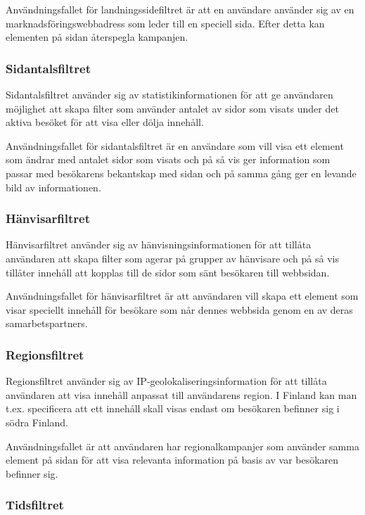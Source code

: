 Användningsfallet för landningssidefiltret är att en användare använder sig av en marknadsföringswebbadress som leder till en speciell sida. Efter detta kan elementen på sidan återspegla kampanjen.

\subsubsection{Sidantalsfiltret}

Sidantalsfiltret använder sig av statistikinformationen för att ge användaren möjlighet att skapa filter som använder antalet av sidor som visats under det aktiva besöket för att visa eller dölja innehåll.

Användningsfallet för sidantalsfiltret är en användare som vill visa ett element som ändrar med antalet sidor som visats och på så vis ger information som passar med besökarens bekantskap med sidan och på samma gång ger en levande bild av informationen.

\subsubsection{Hänvisarfiltret}

Hänvisarfiltret använder sig av hänvisningsinformationen för att tillåta användaren att skapa filter som agerar på grupper av hänvisare och på så vis tillåter innehåll att kopplas till de sidor som sänt besökaren till webbsidan.

Användningsfallet för hänvisarfiltret är att användaren vill skapa ett element som visar speciellt innehåll för besökare som når dennes webbsida genom en av deras samarbetspartners.

\subsubsection{Regionsfiltret}

Regionsfiltret använder sig av IP-geolokaliseringsinformation för att tillåta användaren att visa innehåll anpassat till användarens region. I Finland kan man t.ex. specificera att ett innehåll skall visas endast om besökaren befinner sig i södra Finland.

Användningsfallet är att användaren har regionalkampanjer som använder samma element på sidan för att visa relevanta information på basis av var besökaren befinner sig.

\subsubsection{Tidsfiltret}

